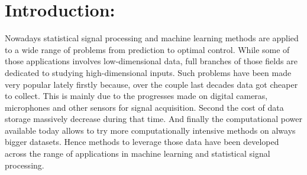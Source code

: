 \documentclass[a4paper,11pt]{report}
\begin{document}
	\vfill	
		
	\newpage
	\thispagestyle{empty}
	\mbox{}
 
	\renewcommand{\contentsname}{Contents:}
	\setcounter{tocdepth}{2}%
	\tableofcontents
	
	\clearpage

	\renewcommand{\listfigurename}{List of figures:}
	\listoffigures

\chapter{Introduction:}
	\label{chap:Intro}
	
	Nowadays statistical signal processing and machine learning methods are applied to a wide range of problems from prediction to optimal control. While some of those applications involves low-dimensional data, full branches of those fields are dedicated to studying high-dimensional inputs. Such problems have been made very popular lately firstly because, over the couple last decades data got cheaper to collect. This is mainly due to the progresses made on digital cameras, microphones and other sensors for signal acquisition. Second the cost of data storage massively decrease during that time. And finally the computational power available today allows to try more computationally intensive methods on always bigger datasets. Hence methods to leverage those data have been developed across the range of applications in machine learning and statistical signal processing.\\
	
\end{document}
